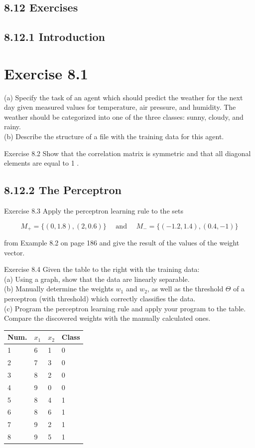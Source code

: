 \documentclass[10pt]{article}
\begin{document}
\subsection*{8.12 Exercises}
\subsection*{8.12.1 Introduction}
\section*{Exercise 8.1}
(a) Specify the task of an agent which should predict the weather for the next day given measured values for temperature, air pressure, and humidity. The weather should be categorized into one of the three classes: sunny, cloudy, and rainy.\\
(b) Describe the structure of a file with the training data for this agent.

Exercise 8.2 Show that the correlation matrix is symmetric and that all diagonal elements are equal to 1 .

\subsection*{8.12.2 The Perceptron}
Exercise 8.3 Apply the perceptron learning rule to the sets


$$
M_{+}=\{(0,1.8),(2,0.6)\} \quad \text { and } \quad M_{-}=\{(-1.2,1.4),(0.4,-1)\}
$$

from Example 8.2 on page 186 and give the result of the values of the weight vector.

Exercise 8.4 Given the table to the right with the training data:\\
(a) Using a graph, show that the data are linearly separable.\\
(b) Manually determine the weights $w_{1}$ and $w_{2}$, as well as the threshold $\Theta$ of a perceptron (with threshold) which correctly classifies the data.\\
(c) Program the perceptron learning rule and apply your program to the table. Compare the discovered weights with the manually calculated ones.

\begin{center}
\begin{tabular}{llll}
\hline
Num. & $x_{1}$ & $x_{2}$ & Class \\
\hline
1 & 6 & 1 & 0 \\
\hline
2 & 7 & 3 & 0 \\
\hline
3 & 8 & 2 & 0 \\
\hline
4 & 9 & 0 & 0 \\
\hline
5 & 8 & 4 & 1 \\
\hline
6 & 8 & 6 & 1 \\
\hline
7 & 9 & 2 & 1 \\
\hline
8 & 9 & 5 & 1 \\
\hline
\end{tabular}
\end{center}
\end{document}
